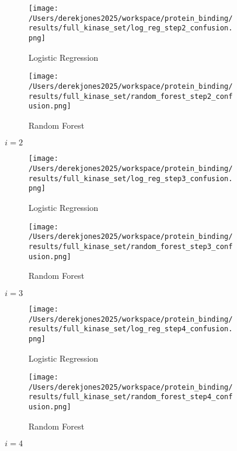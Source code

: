 \documentclass{article}
\begin{document}
\begin{figure}[htpb!]
\begin{subfigure}{.5\textwidth}
  \texttt{[image: /Users/derekjones2025/workspace/protein\_binding/results/full\_kinase\_set/log\_reg\_step2\_confusion.png]}
  \caption{Logistic Regression}
  \label{fig:sub1}
\end{subfigure}%
\begin{subfigure}{.5\textwidth}
  \texttt{[image: /Users/derekjones2025/workspace/protein\_binding/results/full\_kinase\_set/random\_forest\_step2\_confusion.png]}
  \caption{Random Forest}
  \label{fig:sub2}
\end{subfigure}
\caption*{$i=2$}
\label{fig:test}
\end{figure}



\begin{figure}[htpb!]
\begin{subfigure}{.5\textwidth}
  \texttt{[image: /Users/derekjones2025/workspace/protein\_binding/results/full\_kinase\_set/log\_reg\_step3\_confusion.png]}
  \caption{Logistic Regression}
  \label{fig:sub1}
\end{subfigure}%
\begin{subfigure}{.5\textwidth}
  \texttt{[image: /Users/derekjones2025/workspace/protein\_binding/results/full\_kinase\_set/random\_forest\_step3\_confusion.png]}
  \caption{Random Forest}
  \label{fig:sub2}
\end{subfigure}
\caption*{$i=3$}
\label{fig:test}
\end{figure}


\begin{figure}[htpb!]
\begin{subfigure}{.5\textwidth}
  \texttt{[image: /Users/derekjones2025/workspace/protein\_binding/results/full\_kinase\_set/log\_reg\_step4\_confusion.png]}
  \caption{Logistic Regression}
  \label{fig:sub1}
\end{subfigure}%
\begin{subfigure}{.5\textwidth}
  \texttt{[image: /Users/derekjones2025/workspace/protein\_binding/results/full\_kinase\_set/random\_forest\_step4\_confusion.png]}
  \caption{Random Forest}
  \label{fig:sub2}
\end{subfigure}
\caption*{$i=4$}
\label{fig:test}
\end{figure}
\end{document}
